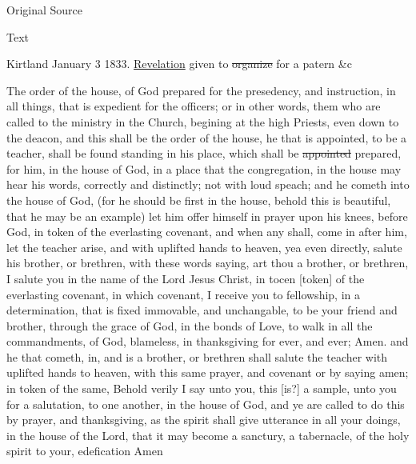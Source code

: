 			
			\begin{description}
				\item[Original Source]
			\end{description}
			
			
			\begin{description}
				\item[Text]
			\end{description}
			
				Kirtland January 3 1833. \uline{Revelation} given to \sout{organize} for a patern \&c
				
				The order of the house, of God prepared for the presedency, and instruction, in all things, that is expedient for the officers; or in other words, them who are called to the ministry in the Church, begining at the high Priests, even down to the deacon, and this shall be the order of the house, he that is appointed, to be a teacher, shall be found standing in his place, which shall be \sout{appointed} prepared, for him, in the house of God, in a place that the congregation, in the house may hear his words, correctly and distinctly; not with loud speach; and he cometh into the house of God, (for he should be first in the house, behold this is beautiful, that he may be an example) let him offer himself in prayer upon his knees, before God, in token of the everlasting covenant, and when any shall, come in after him, let the teacher arise, and with uplifted hands to heaven, yea even directly, salute his brother, or brethren, with these words saying, art thou a brother, or brethren, I salute you in the name of the Lord Jesus Christ, in tocen [token] of the everlasting covenant, in which covenant, I receive you to fellowship, in a determination, that is fixed immovable, and unchangable, to be your friend and brother, through the grace of God, in the bonds of Love, to walk in all the commandments, of God, blameless, in thanksgiving for ever, and ever; Amen. and he that cometh, in, and is a brother, or brethren shall salute the teacher with uplifted hands to heaven, with this same prayer, and covenant or by saying amen; in token of the same, Behold verily I say unto you, this [is?] a sample, unto you for a salutation, to one another, in the house of God, and ye are called to do this by prayer, and thanksgiving, as the spirit shall give utterance in all your doings, in the house of the Lord, that it may become a sanctury, a tabernacle, of the holy spirit to your, edefication Amen
				
